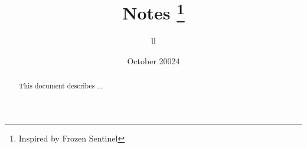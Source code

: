 \documentclass[notoc]{tufte-handout}
\title{Notes \thanks{Inspired by Frozen Sentinel}}
\author{ll}
\date{October 20024}  %
\numberwithin{equation}{section}
\begin{document}
\maketitle%


\begin{abstract}
\noindent This document describes ...
\end{abstract}

\tableofcontents







\newpage


% 
% 
\end{document}
